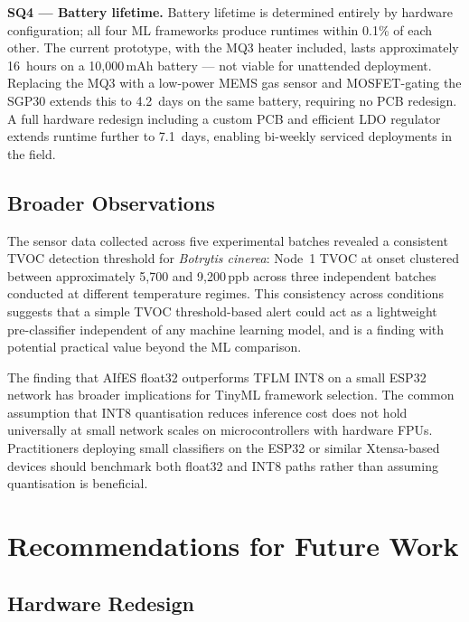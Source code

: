 \textbf{SQ4 --- Battery lifetime.} Battery lifetime is determined entirely by hardware configuration; all four ML frameworks produce runtimes within 0.1\% of each other. The current prototype, with the MQ3 heater included, lasts approximately 16~hours on a 10,000\,mAh battery --- not viable for unattended deployment. Replacing the MQ3 with a low-power MEMS gas sensor and MOSFET-gating the SGP30 extends this to 4.2~days on the same battery, requiring no PCB redesign. A full hardware redesign including a custom PCB and efficient LDO regulator extends runtime further to 7.1~days, enabling bi-weekly serviced deployments in the field.

\subsection{Broader Observations}

The sensor data collected across five experimental batches revealed a consistent TVOC detection threshold for \textit{Botrytis cinerea}: Node~1 TVOC at onset clustered between approximately 5,700 and 9,200\,ppb across three independent batches conducted at different temperature regimes. This consistency across conditions suggests that a simple TVOC threshold-based alert could act as a lightweight pre-classifier independent of any machine learning model, and is a finding with potential practical value beyond the ML comparison.

The finding that AIfES float32 outperforms TFLM INT8 on a small ESP32 network has broader implications for TinyML framework selection. The common assumption that INT8 quantisation reduces inference cost does not hold universally at small network scales on microcontrollers with hardware FPUs. Practitioners deploying small classifiers on the ESP32 or similar Xtensa-based devices should benchmark both float32 and INT8 paths rather than assuming quantisation is beneficial.

\section{Recommendations for Future Work}\label{sec:recommendations}

\subsection{Hardware Redesign}

